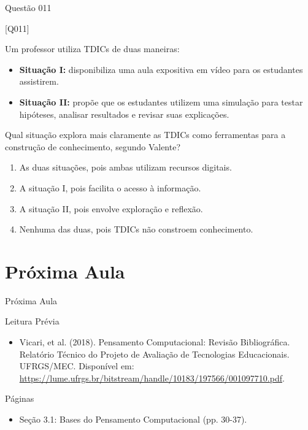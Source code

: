 \documentclass[xcolor=dvipsnames,table]{beamer}
\begin{document}
\begin{frame}{Questão 011}

    \begin{block}{[Q011]}

    Um professor utiliza TDICs de duas maneiras:

    \begin{itemize}

        \item \textbf{Situação I:} disponibiliza uma aula expositiva
        em vídeo para os estudantes assistirem.

        \item \textbf{Situação II:} propõe que os estudantes utilizem
        uma simulação para testar hipóteses, analisar resultados
        e revisar suas explicações.

    \end{itemize}

    Qual situação explora mais claramente as TDICs como ferramentas
    para a construção de conhecimento, segundo Valente?

    \end{block}

    \begin{enumerate}[label=(\Alph*)]

        \item As duas situações, pois ambas utilizam recursos digitais.
		
		\item A situação I, pois facilita o acesso à informação.

        \item A situação II, pois envolve exploração e reflexão.

        \item Nenhuma das duas, pois TDICs não constroem conhecimento.

    \end{enumerate}

\end{frame}

\section{Próxima Aula}
\begin{frame}{Próxima Aula}
    \begin{block}{Leitura Prévia}
        \begin{itemize}
            \item Vicari, et al. (2018). Pensamento Computacional: Revisão Bibliográfica. Relatório Técnico do Projeto de Avaliação de Tecnologias Educacionais. UFRGS/MEC. Disponível em: \url{https://lume.ufrgs.br/bitstream/handle/10183/197566/001097710.pdf}.  
        \end{itemize}
    \end{block}
    \begin{block}{Páginas}
        \begin{itemize}
        \item Seção 3.1: Bases do Pensamento Computacional (pp. 30-37).
        \end{itemize}
    \end{block}
\end{frame}
	
	\begin{frame}
		\titlepage
	\end{frame}
	
\end{document}
